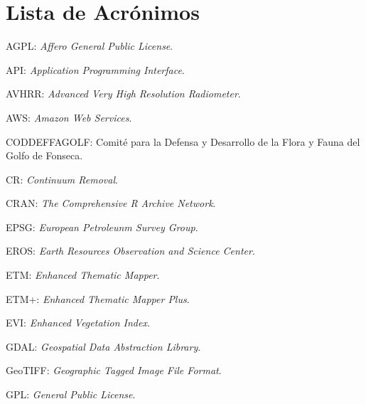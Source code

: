 


\chapter*{Lista de Acrónimos}

AGPL: \textit{Affero General Public License}.

API: \textit{Application Programming Interface}.

AVHRR: \textit{Advanced Very High Resolution Radiometer}.

AWS: \textit{Amazon Web Services}.

CODDEFFAGOLF: Comité para la Defensa y Desarrollo de la Flora y Fauna del Golfo de Fonseca.

CR: \textit{Continuum Removal}.

CRAN: \textit{The Comprehensive R Archive Network}.

EPSG: \textit{European Petroleunm Survey Group}.

EROS: \textit{Earth Resources Observation and Science Center}.

ETM: \textit{Enhanced Thematic Mapper}.

ETM+: \textit{Enhanced Thematic Mapper Plus}.

EVI: \textit{Enhanced Vegetation Index}.

GDAL: \textit{Geospatial Data Abstraction Library}.

GeoTIFF: \textit{Geographic Tagged Image File Format}.

GPL: \textit{General Public License}.

